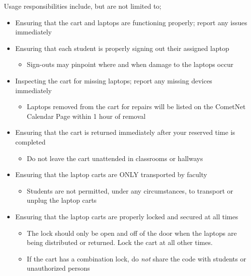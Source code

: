 \begin{titlepage}
\small
Usage responsibilities include, but are not limited to;
\begin{itemize}
\item Ensuring that the cart and laptops are functioning properly; report any issues immediately
\item Ensuring that each student is properly signing out their assigned laptop
\begin{itemize}
\item Sign-outs may pinpoint where and when damage to the laptops occur
\end{itemize}
\item Inspecting the cart for missing laptops; report any missing devices immediately
\begin{itemize}
\item Laptops removed from the cart for repairs will be listed on the CometNet Calendar Page within 1 hour of removal
\end{itemize}
\item Ensuring that the cart is returned immediately after your reserved time is completed
\begin{itemize}
\item Do not leave the cart unattended in classrooms or hallways
\end{itemize}
\item Ensuring that the laptop carts are ONLY transported by faculty
\begin{itemize}
\item Students are not permitted, under any circumstances, to transport or unplug the laptop carts
\end{itemize}
\item Ensuring that the laptop carts are properly locked and secured at all times
\begin{itemize}
\item The lock should only be open and off of the door when the laptops are being distributed or returned. Lock the cart at all other times.
\item If the cart has a combination lock, do \emph{not} share the code with students or unauthorized persons
\end{itemize}
\end{itemize}
\end{titlepage}
